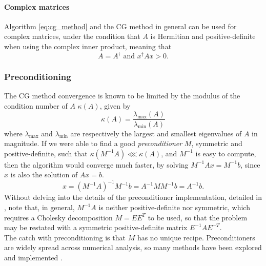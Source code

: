 \paragraph{Complex matrices} Algorithm \eqref{eq:cg_method} and the CG method in general can be used for complex matrices, under the condition that $A$ is Hermitian and positive-definite when using the complex inner product, meaning that
\begin{equation}
    A = A^\dagger\text{ and }
    x^\dagger Ax > 0.
\end{equation}
\subsubsection{Preconditioning}
\label{sec:preconditioning}
The CG method convergence is known to be limited by the modulus of the condition number of $A$ $\kappa(A)$, given by \cite{PainlessCGM}
\begin{equation}
    \label{eq:cond_num}
    \kappa(A) = \frac{\lambda_\text{max}(A)}{\lambda_\text{min}(A)}
\end{equation}
where $\lambda_\text{max}$ and $\lambda_\text{min}$ are respectively the largest and smallest eigenvalues of $A$ in magnitude.
If we were able to find a good \textit{preconditioner} $M$, symmetric and positive-definite, such that $\kappa(M^{-1}A) \lll \kappa(A)$, and $M^{-1}$ is easy to compute, then the algorithm would converge much faster, by solving $M^{-1}Ax = M^{-1}b$, since $x$ is also the solution of $Ax = b$.
\begin{equation}
    \label{eq:precond}
    x = (M^{-1}A)^{-1} M^{-1}b = A^{-1} MM^{-1} b = A^{-1} b.
\end{equation}
Without delving into the details of the preconditioner implementation, detailed in \cite{PainlessCGM}, note that, in general, $M^{-1}A$ is neither positive-definite nor symmetric, which requires a Cholesky decomposition \cite{cholesky} $M = EE^T$ to be used, so that the problem may be restated with a symmetric positive-definite matrix $E^{-1}AE^{-T}$.
\\The catch with preconditioning is that $M$ has no unique recipe. Preconditioners are widely spread across numerical analysis, so many methods have been explored and implemented \cite{pearson2020preconditioners}.
